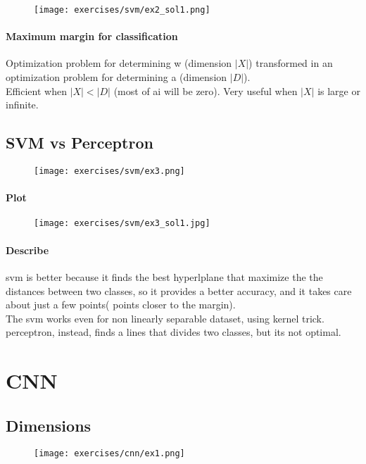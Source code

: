 \begin{figure}[H]
    \centering
    \texttt{[image: exercises/svm/ex2\_sol1.png]}
\end{figure}

\paragraph{Maximum margin for classification}
Optimization problem for determining w (dimension $|X|$) transformed in an optimization problem for determining a (dimension $|D|$).\\
Efficient when $|X| < |D|$ (most of ai will be zero). Very useful when $|X|$ is large or infinite.


\subsection{SVM vs Perceptron}

\begin{figure}[H]
    \centering
    \texttt{[image: exercises/svm/ex3.png]}
\end{figure}

\paragraph{Plot}
\begin{figure}[H]
    \centering
    \texttt{[image: exercises/svm/ex3\_sol1.jpg]}
\end{figure}

\paragraph{Describe}
svm is better because it finds the best hyperlplane that maximize the the distances between two classes, so it provides a better accuracy, and it takes care about just a few points( points closer to the margin). \\

The svm works even for non linearly separable dataset, using kernel trick. perceptron, instead, finds a lines that divides two classes, but its not optimal.


\section{CNN}


\subsection{Dimensions}
\begin{figure}[H]
    \centering
    \texttt{[image: exercises/cnn/ex1.png]}
\end{figure}

